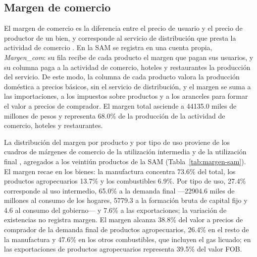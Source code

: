 \documentclass[11pt]{article}
\begin{document}
\subsection{Margen de comercio}
\label{sec:sam-margen}

El margen de comercio es la diferencia entre el precio de usuario y el precio de productor de un bien, y corresponde al servicio de distribución que presta la actividad de comercio \cite{sna_2008}. En la SAM se registra en una cuenta propia, \textit{Margen\_com}: su fila recibe de cada producto el margen que pagan sus usuarios, y su columna paga a la actividad de comercio, hoteles y restaurantes la producción del servicio. De este modo, la columna de cada producto valora la producción doméstica a precios básicos, sin el servicio de distribución, y el margen se suma a las importaciones, a los impuestos sobre productos y a los aranceles para formar el valor a precios de comprador. El margen total asciende a 44135.0 miles de millones de pesos y representa 68.0\% de la producción de la actividad de comercio, hoteles y restaurantes.

La distribución del margen por producto y por tipo de uso proviene de los cuadros de márgenes de comercio de la utilización intermedia y de la utilización final \cite{bcch_cou_2023}, agregados a los veintiún productos de la SAM (Tabla~\ref{tab:margen-sam}). El margen recae en los bienes: la manufactura concentra 73.6\% del total, los productos agropecuarios 13.7\% y los combustibles 6.9\%. Por tipo de uso, 27.4\% corresponde al uso intermedio, 65.0\% a la demanda final ---22904.6 miles de millones al consumo de los hogares, 5779.3 a la formación bruta de capital fijo y 4.6 al consumo del gobierno--- y 7.6\% a las exportaciones; la variación de existencias no registra margen. El margen alcanza 38.8\% del valor a precios de comprador de la demanda final de productos agropecuarios, 26.4\% en el resto de la manufactura y 47.6\% en los otros combustibles, que incluyen el gas licuado; en las exportaciones de productos agropecuarios representa 39.5\% del valor FOB.
\end{document}
